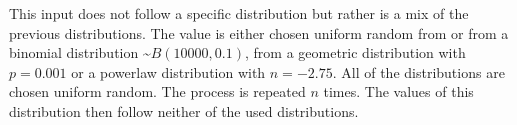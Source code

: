This input does not follow a specific distribution but rather is a mix of the previous distributions.
The value is either chosen uniform random from  or from a binomial distribution \textasciitilde$B(10000, 0.1)$, from a geometric distribution with $p=0.001$ or a powerlaw distribution with $n=-2.75$.
All of the distributions are chosen uniform random.
The process is repeated $n$ times.
The values of this distribution then follow neither of the used distributions.
